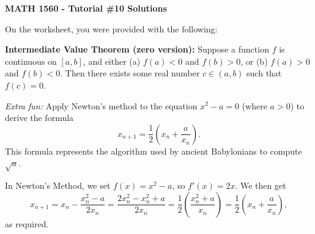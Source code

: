 \documentclass[12pt]{article}
\begin{document}
\author{Instructor: Sean Fitzpatrick}
\thispagestyle{empty}
\begin{center}
{\bf MATH 1560 - Tutorial \#10 Solutions}
\end{center}

On the worksheet, you were provided with the following:

\textbf{Intermediate Value Theorem (zero version):} Suppose a function $f$ is continuous on $[a,b]$, and either (a) $f(a)<0$ and $f(b)>0$, or (b) $f(a)>0$ and $f(b)<0$. Then there exists some real number $c\in (a,b)$ such that $f(c)=0$.

\bigskip

\textit{Extra fun:} Apply Newton's method to the equation $x^2-a=0$ (where $a>0$) to derive the formula
\[
x_{n+1} = \frac12\left(x_n+\frac{a}{x_n}\right).
\]
This formula represents the algorithm used by ancient Babylonians to compute $\sqrt{a}$.


\bigskip

In Newton's Method, we set $f(x)=x^2-a$, so $f'(x)=2x$. We then get
\[
x_{n+1} = x_n-\frac{x_n^2-a}{2x_n} = \frac{2x_n^2-x_n^2+a}{2x_n} = \frac12\left(\frac{x_n^2+a}{x_n}\right) = \frac12\left(x_n+\frac{a}{x_n}\right),
\]
as required.
\end{document}
